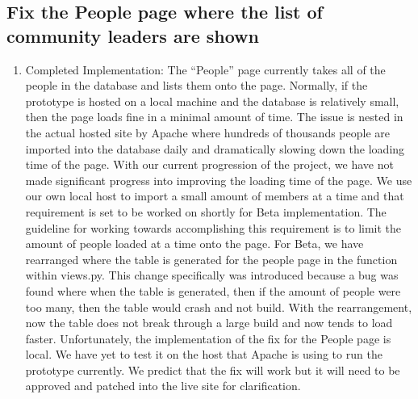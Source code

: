 \documentclass[draftclsnofoot,10pt,onecolumn]{IEEEtran} %
\begin{document}
\subsection{Fix the People page where the list of community leaders are shown}
\begin{enumerate}
  \item Completed Implementation: The “People” page currently takes all of the
    people in the database and lists them onto the page. Normally, if the
    prototype is hosted on a local machine and the database is relatively small,
    then the page loads fine in a minimal amount of time. The issue is nested in
    the actual hosted site by Apache where hundreds of thousands people are
    imported into the database daily and dramatically slowing down the loading
    time of the page.  With our current progression of the project, we have not
    made significant progress into improving the loading time of the page. We
    use our own local host to import a small amount of members at a time and
    that requirement is set to be worked on shortly for Beta implementation. The
    guideline for working towards accomplishing this requirement is to limit the
    amount of people loaded at a time onto the page. For Beta, we have
    rearranged where the table is generated for the people page in the function
    within views.py. This change specifically was introduced because a bug was
    found where when the table is generated, then if the amount of people were
    too many, then the table would crash and not build. With the rearrangement,
    now the table does not break through a large build and now tends to load
    faster. Unfortunately, the implementation of the fix for the People page is
    local. We have yet to test it on the host that Apache is using to run the
    prototype currently. We predict that the fix will work but it will need to
    be approved and patched into the live site for clarification.
\end{enumerate}
\end{document}
